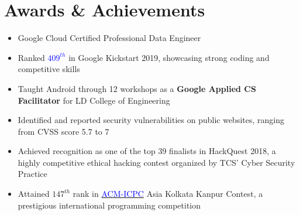 \documentclass[letterpaper,11pt]{article}
\newcommand{\resumeItem}[1]{
  \item\small{
    {#1 \vspace{-2pt}}
  }
}
\newcommand{\resumeSubHeadingListStart}{\begin{itemize}[leftmargin=0.15in, label={}]}
\newcommand{\resumeSubHeadingListEnd}{\end{itemize}}
\newcommand{\resumeItemListStart}{\begin{itemize}}
\newcommand{\resumeItemListEnd}{\end{itemize}\vspace{-5pt}}
\begin{document}
\section{Awards \& Achievements}
  \vspace{2pt}
  \resumeSubHeadingListStart
    \small{\item{
        \resumeItemListStart
            \resumeItem{Google Cloud Certified Professional Data Engineer}
            \resumeItem{Ranked {\href{https://codingcompetitions.withgoogle.com/kickstart/round/0000000000050edd}{\textcolor{blue}{$409^{th}$}}}  in Google Kickstart 2019, showcasing strong coding and competitive skills}
            \resumeItem{Taught Android through 12 workshops as a \textbf{Google Applied CS Facilitator} for LD College of Engineering}
            \resumeItem{Identified and reported security vulnerabilities on public websites, ranging from CVSS score 5.7 to 7}
            \resumeItem{Achieved recognition as one of the top 39 finalists in HackQuest 2018, a highly competitive ethical hacking contest organized by TCS' Cyber Security Practice}
            \resumeItem{Attained {$147^{th}$} rank in {\href{https://drive.google.com/file/d/19BKk_nhR-VvfI7R_30px68YTmWSB1CHY/view?usp=sharing}{\textcolor{blue}{ACM-ICPC}}} Asia Kolkata Kanpur Contest, a prestigious international programming competition}
        \resumeItemListEnd
    }}
  \resumeSubHeadingListEnd


\end{document}
